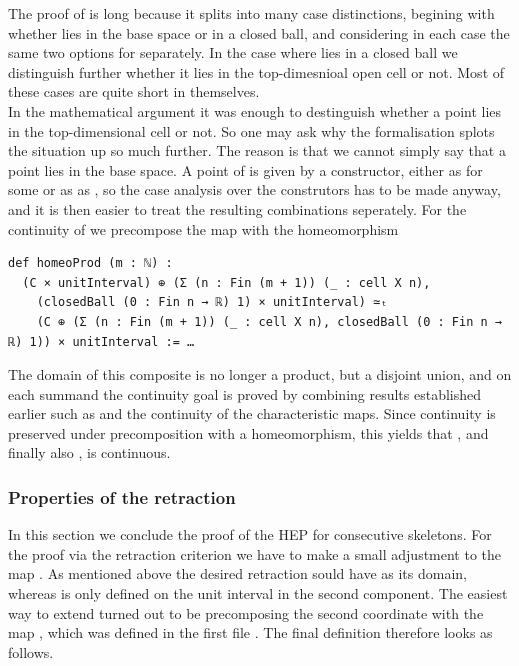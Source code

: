\documentclass[11pt, a4paper, english]{article}
\theoremstyle{plain}
\theoremstyle{definition}
\theoremstyle{remark}
\numberwithin{equation}{section}
\numberwithin{theorem}{section}
\begin{document}
The proof of  is long because it splits into many case distinctions, begining with whether  lies in the base space or in a closed ball, and considering in each case the same two options for  separately. In the case where  lies in a closed ball we distinguish further whether it lies in the top-dimesnioal open cell or not. Most of these cases are quite short in themselves. \\
In the mathematical argument it was enough to destinguish whether a point lies in the top-dimensional cell or not. So one may ask why the formalisation splots the situation up so much further. The reason is that we cannot simply say that a point lies in the base space. A point of  is given by a constructor, either as  for some  or as as , so the case analysis over the construtors has to be made anyway, and it is then easier to treat the resulting combinations seperately. %
For the continuity of  we precompose the map with the homeomorphism 
\begin{verbatim}
def homeoProd (m : ℕ) :
  (C × unitInterval) ⊕ (Σ (n : Fin (m + 1)) (_ : cell X n),
    (closedBall (0 : Fin n → ℝ) 1) × unitInterval) ≃ₜ
    (C ⊕ (Σ (n : Fin (m + 1)) (_ : cell X n), closedBall (0 : Fin n → ℝ) 1)) × unitInterval := …
\end{verbatim}
The domain of this composite is no longer a product, but a disjoint union, and on each summand the continuity goal is proved by combining results established earlier such as  and the continuity of the characteristic maps. Since continuity is preserved under precomposition with a homeomorphism, this yields that , and finally also , is continuous.  

\subsubsection {Properties of the retraction} \label{subsubsec:lean:skel:propertiesretraction}
In this section we conclude the proof of the HEP for consecutive skeletons. For the proof via the retraction criterion we have to make a small adjustment to the map . As mentioned above the desired retraction sould have  as its domain, whereas  is only defined on the unit interval in the second component. The easiest way to extend  turned out to be precomposing the second coordinate with the map , which was defined in the first file . The final definition therefore looks as follows.
\end{document}
